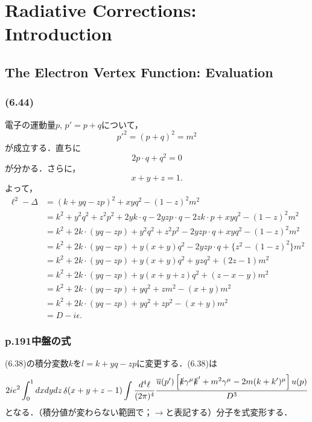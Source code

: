 \chapter{Radiative Corrections: Introduction}
\setcounter{section}{2}
\section{The Electron Vertex Function: Evaluation}
\subsection{(6.44)}
電子の運動量$p$, $p'=p+q$について，
\[ p'^2 = (p+q)^2 = m^2 \]
が成立する．直ちに
\[ 2p \cdot q  + q^2 = 0 \]
が分かる．さらに，
\[ x + y + z = 1 . \]
よって，
\begin{align*}
  \ell^2 - \Delta &= (k + yq - zp)^2 + xyq^2 - (1-z)^2 m^2 \\
  &= k^2 + y^2q^2 + z^2p^2 + 2y k \cdot q - 2yz p \cdot q - 2z k \cdot p  + xyq^2 - (1-z)^2 m^2 \\
  &= k^2 + 2 k \cdot (yq - zp) + y^2q^2 + z^2p^2 - 2yz p \cdot q + xyq^2 - (1-z)^2 m^2 \\
  &= k^2 + 2 k \cdot (yq - zp) + y(x+y)q^2 - 2yz p \cdot q + \{ z^2 - (1-z)^2 \} m^2 \\
  &= k^2 + 2 k \cdot (yq - zp) + y(x+y)q^2 + yz q^2 + (2z-1) m^2 \\
  &= k^2 + 2 k \cdot (yq - zp) + y(x+y+z)q^2 + (z-x-y) m^2 \\
  &= k^2 + 2 k \cdot (yq - zp) + yq^2 + zm^2 - (x+y)m^2 \\
  &= k^2 + 2 k \cdot (yq - zp) + yq^2 + zp^2 - (x+y)m^2 \\
  &= D - i\epsilon .
\end{align*}

\subsection{p.191中盤の式}
(6.38)の積分変数$k$を$l = k + yq - zp$に変更する．(6.38)は
\begin{align}
  2ie^2 \int_0^1 dxdydz \mathop\delta(x+y+z-1) \int \frac{d^4\ell}{(2\pi)^4}
  \frac{\overline{u}(p') \left[ \slashed{k} \gamma^\mu \slashed{k}' + m^2\gamma^\mu - 2m (k+k')^\mu \right] u(p)}{D^3} \label{eq_p_191_vertex_factor}
\end{align}
となる．（積分値が変わらない範囲で；$\to$と表記する）分子を式変形する．

